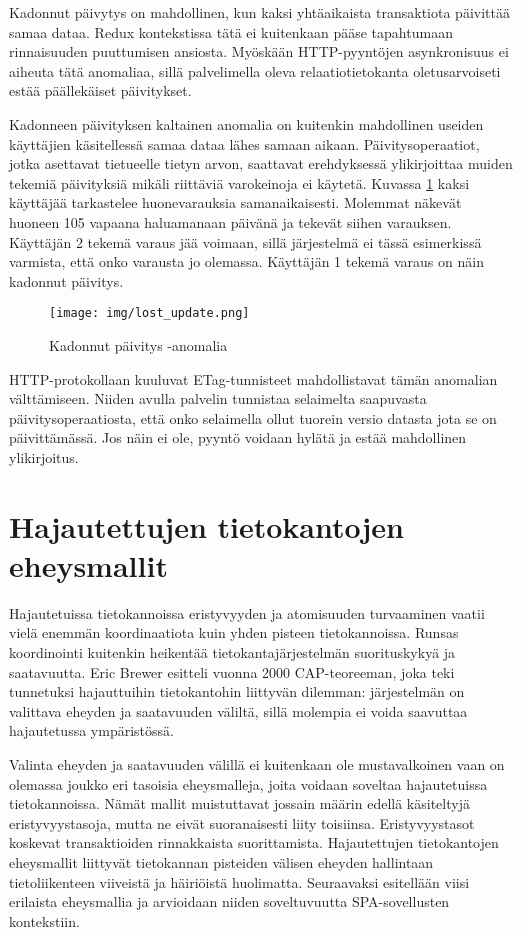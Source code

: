 \documentclass[finnish,twoside,censored,csm,sw-track-2018]{HYthesisML}
\begin{document}
Kadonnut päivytys on mahdollinen, kun kaksi yhtäaikaista transaktiota päivittää samaa dataa. Redux kontekstissa tätä ei kuitenkaan pääse tapahtumaan rinnaisuuden puuttumisen ansiosta. Myöskään HTTP-pyyntöjen asynkronisuus ei aiheuta tätä anomaliaa, sillä palvelimella oleva relaatiotietokanta oletusarvoiseti estää päällekäiset päivitykset.

Kadonneen päivityksen kaltainen anomalia on kuitenkin mahdollinen useiden käyttäjien käsitellessä samaa dataa lähes samaan aikaan. Päivitysoperaatiot, jotka asettavat tietueelle tietyn arvon, saattavat erehdyksessä ylikirjoittaa muiden tekemiä päivityksiä mikäli riittäviä varokeinoja ei käytetä. Kuvassa \ref{fig-lostupdate} kaksi käyttäjää tarkastelee huonevarauksia samanaikaisesti. Molemmat näkevät huoneen 105 vapaana haluamanaan päivänä ja tekevät siihen varauksen. Käyttäjän 2 tekemä varaus jää voimaan, sillä järjestelmä ei tässä esimerkissä varmista, että onko varausta jo olemassa. Käyttäjän 1 tekemä varaus on näin kadonnut päivitys.

\begin{figure}[ht]
  \centering
    \texttt{[image: img/lost\_update.png]}
  \caption{Kadonnut päivitys -anomalia}
  \label{fig-lostupdate}
\end{figure}

HTTP-protokollaan kuuluvat ETag-tunnisteet mahdollistavat tämän anomalian välttämiseen. Niiden avulla palvelin tunnistaa selaimelta saapuvasta päivitysoperaatiosta, että onko selaimella ollut tuorein versio datasta jota se on päivittämässä. Jos näin ei ole, pyyntö voidaan hylätä ja estää mahdollinen ylikirjoitus.

\section{Hajautettujen tietokantojen eheysmallit}

Hajautetuissa tietokannoissa eristyvyyden ja atomisuuden turvaaminen vaatii vielä enemmän koordinaatiota kuin yhden pisteen tietokannoissa. Runsas koordinointi kuitenkin heikentää tietokantajärjestelmän suorituskykyä ja saatavuutta. Eric Brewer esitteli vuonna 2000 CAP-teoreeman, joka teki tunnetuksi hajauttuihin tietokantohin liittyvän dilemman: järjestelmän on valittava eheyden ja saatavuuden väliltä, sillä molempia ei voida saavuttaa hajautetussa ympäristössä. 

Valinta eheyden ja saatavuuden välillä ei kuitenkaan ole mustavalkoinen vaan on olemassa joukko eri tasoisia eheysmalleja, joita voidaan soveltaa hajautetuissa tietokannoissa. Nämät mallit muistuttavat jossain määrin edellä käsiteltyjä eristyvyystasoja, mutta ne eivät suoranaisesti liity toisiinsa. Eristyvyystasot koskevat transaktioiden rinnakkaista suorittamista. Hajautettujen tietokantojen eheysmallit liittyvät tietokannan pisteiden välisen eheyden hallintaan tietoliikenteen viiveistä ja häiriöistä huolimatta. Seuraavaksi esitellään viisi erilaista eheysmallia ja arvioidaan niiden soveltuvuutta SPA-sovellusten kontekstiin.
\end{document}
